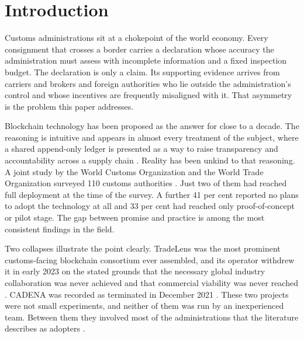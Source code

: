 \documentclass[information,article,submit,moreauthors]{Definitions/mdpi}
\begin{document}
\section{Introduction}

Customs administrations sit at a chokepoint of the world economy. Every consignment that crosses a border carries a declaration whose accuracy the administration must assess with incomplete information and a fixed inspection budget. The declaration is only a claim. Its supporting evidence arrives from carriers and brokers and foreign authorities who lie outside the administration's control and whose incentives are frequently misaligned with it. That asymmetry is the problem this paper addresses.

Blockchain technology has been proposed as the answer for close to a decade. The reasoning is intuitive and appears in almost every treatment of the subject, where a shared append-only ledger is presented as a way to raise transparency and accountability across a supply chain \cite{kshetri2018roles}. Reality has been unkind to that reasoning. A joint study by the World Customs Organization and the World Trade Organization surveyed 110 customs authorities \cite{wco2022disruptive}. Just two of them had reached full deployment at the time of the survey. A further 41 per cent reported no plans to adopt the technology at all and 33 per cent had reached only proof-of-concept or pilot stage. The gap between promise and practice is among the most consistent findings in the field.

Two collapses illustrate the point clearly. TradeLens was the most prominent customs-facing blockchain consortium ever assembled, and its operator withdrew it in early 2023 on the stated grounds that the necessary global industry collaboration was never achieved and that commercial viability was never reached \cite{maersk2022tradelens}. CADENA was recorded as terminated in December 2021 \cite{unescap2024digitalizetrade}. These two projects were not small experiments, and neither of them was run by an inexperienced team. Between them they involved most of the administrations that the literature describes as adopters \cite{wco2022casestudies,unescap2024digitalizetrade}.
\end{document}
